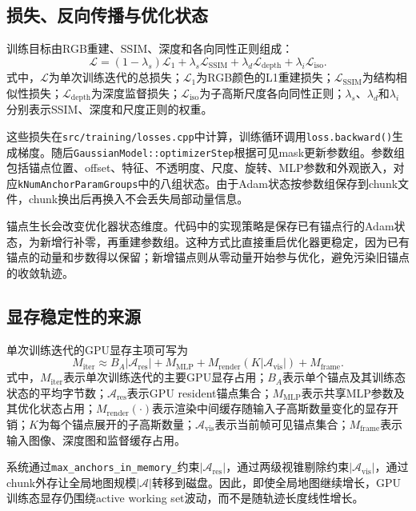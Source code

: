 \subsection{损失、反向传播与优化状态}

训练目标由RGB重建、SSIM、深度和各向同性正则组成：
\begin{equation}
\mathcal{L}
=
(1-\lambda_s)\mathcal{L}_{1}
+
\lambda_s\mathcal{L}_{\mathrm{SSIM}}
+
\lambda_d\mathcal{L}_{\mathrm{depth}}
+
\lambda_i\mathcal{L}_{\mathrm{iso}}.
\end{equation}
式中，$\mathcal{L}$为单次训练迭代的总损失；$\mathcal{L}_{1}$为RGB颜色的L1重建损失；$\mathcal{L}_{\mathrm{SSIM}}$为结构相似性损失；$\mathcal{L}_{\mathrm{depth}}$为深度监督损失；$\mathcal{L}_{\mathrm{iso}}$为子高斯尺度各向同性正则；$\lambda_s$、$\lambda_d$和$\lambda_i$分别表示SSIM、深度和尺度正则的权重。

这些损失在\texttt{src/training/losses.cpp}中计算，训练循环调用\texttt{loss.backward()}生成梯度。随后\texttt{GaussianModel::optimizerStep}根据可见mask更新参数组。参数组包括锚点位置、offset、特征、不透明度、尺度、旋转、MLP参数和外观嵌入，对应\texttt{kNumAnchorParamGroups}中的八组状态。由于Adam状态按参数组保存到chunk文件，chunk换出后再换入不会丢失局部动量信息。

锚点生长会改变优化器状态维度。代码中的实现策略是保存已有锚点行的Adam状态，为新增行补零，再重建参数组。这种方式比直接重启优化器更稳定，因为已有锚点的动量和步数得以保留；新增锚点则从零动量开始参与优化，避免污染旧锚点的收敛轨迹。

\subsection{显存稳定性的来源}

单次训练迭代的GPU显存主项可写为
\begin{equation}
M_{\mathrm{iter}}
\approx
B_A|\mathcal{A}_{\mathrm{res}}|
+
M_{\mathrm{MLP}}
+
M_{\mathrm{render}}(K|\mathcal{A}_{\mathrm{vis}}|)
+
M_{\mathrm{frame}}.
\end{equation}
式中，$M_{\mathrm{iter}}$表示单次训练迭代的主要GPU显存占用；$B_A$表示单个锚点及其训练态状态的平均字节数；$\mathcal{A}_{\mathrm{res}}$表示GPU resident锚点集合；$M_{\mathrm{MLP}}$表示共享MLP参数及其优化状态占用；$M_{\mathrm{render}}(\cdot)$表示渲染中间缓存随输入子高斯数量变化的显存开销；$K$为每个锚点展开的子高斯数量；$\mathcal{A}_{\mathrm{vis}}$表示当前帧可见锚点集合；$M_{\mathrm{frame}}$表示输入图像、深度图和监督缓存占用。

系统通过\texttt{max\_anchors\_in\_memory\_}约束$|\mathcal{A}_{\mathrm{res}}|$，通过两级视锥剔除约束$|\mathcal{A}_{\mathrm{vis}}|$，通过chunk外存让全局地图规模$|\mathcal{A}|$转移到磁盘。因此，即使全局地图继续增长，GPU训练态显存仍围绕active working set波动，而不是随轨迹长度线性增长。


